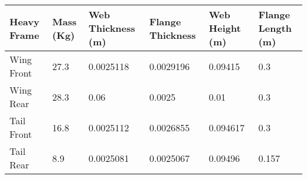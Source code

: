 \begin{tabular}{llllll}
Heavy Frame & Mass (Kg) & Web Thickness (m) & Flange Thickness & Web Height (m) & Flange Length (m) \\ 
\hline 
Wing Front & 27.3 & 0.0025118 & 0.0029196 & 0.09415 & 0.3 \\ 
Wing Rear & 28.3 & 0.06 & 0.0025 & 0.01 & 0.3 \\ 
Tail Front & 16.8 & 0.0025112 & 0.0026855 & 0.094617 & 0.3 \\ 
Tail Rear & 8.9 & 0.0025081 & 0.0025067 & 0.09496 & 0.157 \\ 
\hline 
\end{tabular}